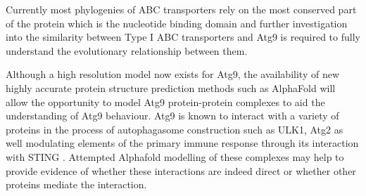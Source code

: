 Currently most phylogenies of ABC transporters rely on the most conserved part of the protein which is the nucleotide binding domain and further investigation into the similarity between Type I ABC transporters and Atg9 is required to fully understand the evolutionary relationship between them. 

Although a high resolution model now exists for Atg9, the availability of new highly accurate protein structure prediction methods such as AlphaFold will allow the opportunity to model Atg9 protein-protein complexes to aid the understanding of Atg9 behaviour.  Atg9 is known to interact with a variety of proteins in the process of autophagasome construction such as ULK1, Atg2 as well modulating elements of the primary immune response through its interaction with STING \cite{li2019tmem203}.  Attempted Alphafold modelling of these complexes may help to provide evidence of whether these interactions are indeed direct or whether other proteins mediate the interaction.





